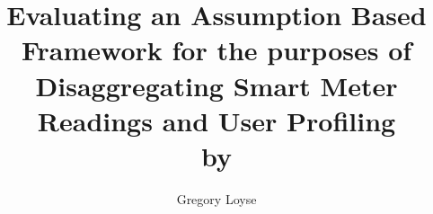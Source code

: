 \documentclass[a4paper,11pt,twoside]{report}
\begin{document}
\title{\LARGE {\bf Evaluating an Assumption Based Framework for the purposes of Disaggregating Smart Meter Readings and User Profiling}\\
 \vspace*{6mm}
 \small by
}

\author{Gregory Loyse}

\normallinespacing
\maketitle

\preface





\body









\appendix




\end{document}
